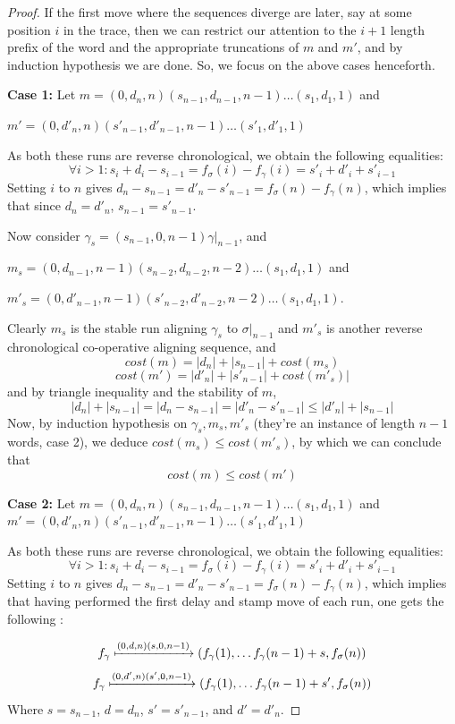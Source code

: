 \documentclass[runningheads]{llncs}
\newcounter{cases}
\begin{document}
\begin{proof}
If the first move where the sequences diverge are later, say at some position $i$ in the trace, then we can restrict our attention to the $i+1$ length prefix of the word and the appropriate truncations of $m$ and $m'$, and by induction hypothesis we are done. 
So, we focus on the above cases henceforth. 


\textbf{Case 1: } Let $m = (0, d_n, n)(s_{n-1}, d_{n-1}, n-1) \dots (s_1, d_1, 1)$ and 

$m' = (0, d'_n, n)(s'_{n-1}, d'_{n-1}, n-1) \dots (s'_1, d'_1, 1)$ 

As both these runs are reverse chronological, we obtain the following equalities: $$\forall i > 1 : s_i + d_i - s_{i-1} = f_\sigma(i) - f_\gamma(i) = s'_i + d'_i + s'_{i-1}$$ 
Setting $i$ to $n$ gives $d_n - s_{n-1} = d'_n - s'_{n-1} = f_\sigma(n) - f_\gamma(n)$, which implies that  since $d_n = d'_n$, $s_{n-1} = s'_{n-1}$. 

Now consider $\gamma_s = (s_{n-1}, 0, n-1)\gamma|_{n-1}$, and 

$m_s = (0, d_{n-1}, n-1)(s_{n-2}, d_{n-2}, n-2)\dots (s_1, d_1, 1)$ and 

$m'_s = (0, d'_{n-1}, n-1)(s'_{n-2}, d'_{n-2}, n-2)\dots (s_1, d_1, 1)$. 

Clearly $m_s$ is the stable run aligning $\gamma_s$ to $\sigma|_{n-1}$ and $m'_s$ is another reverse chronological co-operative aligning sequence, and $$cost(m) = |d_n| + |s_{n-1}| + cost(m_s)$$ $$cost(m') = |d'_n| + |s'_{n-1}| + cost(m'_s)|$$ and by triangle inequality and the stability of $m$, $$|d_n| + |s_{n-1}| = |d_n - s_{n-1}| = |d'_n - s'_{n-1}| \leq |d'_n| + |s_{n-1}|$$ 
Now, by induction hypothesis on $\gamma_s, m_s, m'_s$ (they're an instance of length $n-1$ words, case 2),  we deduce $cost(m_s) \leq cost(m'_s)$, by which we can conclude that $$cost(m) \leq cost(m')$$

\textbf{Case 2:} Let $m = {(0, d_n, n)(s_{n-1}, d_{n-1}, n-1) \dots (s_1, d_1, 1)}$ and 
$m' = (0, d'_n, n)(s'_{n-1}, d'_{n-1}, n-1) \dots (s'_1, d'_1, 1)$ 

As both these runs are reverse chronological, we obtain the following equalities: $$\forall i > 1 : s_i + d_i - s_{i-1} = f_\sigma(i) - f_\gamma(i) = s'_i + d'_i + s'_{i-1}$$ 
Setting $i$ to $n$ gives $d_n - s_{n-1} = d'_n - s'_{n-1} = f_\sigma(n) - f_\gamma(n)$, which implies that having performed the first delay and stamp move of each run, one gets the following :  

$$f_\gamma \xmapsto{(0, d, n)(s, 0, n-1)} (f_\gamma(1), \dots f_\gamma(n-1) + s, f_\sigma(n))$$
$$f_\gamma \xmapsto{(0, d', n)(s', 0, n-1)} (f_\gamma(1), \dots f_\gamma(n-1) + s', f_\sigma(n))$$
Where $s = s_{n-1}$, $d = d_n$, $s' = s'_{n-1}$, and $d' = d'_n$. 


\end{proof}
\end{document}

